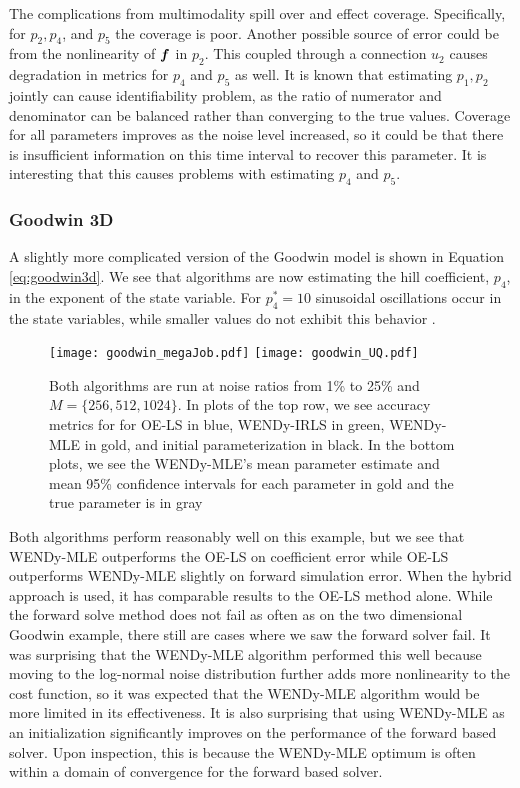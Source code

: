 The complications from multimodality spill over and effect coverage. Specifically, for $p_2, p_4$, and $p_5$ the coverage is poor. Another possible source of error could be from the nonlinearity of $\boldsymbol{f}$ in $p_2$. This coupled through a connection $u_2$ causes degradation in metrics for $p_4$ and $p_5$ as well. It is known that estimating $p_1, p_2$ jointly can cause identifiability problem, as the ratio of numerator and denominator can be balanced rather than converging to the true values. Coverage for all parameters improves as the noise level increased, so it could be that there is insufficient information on this time interval to recover this parameter. It is interesting that this causes problems with estimating $p_4$ and $p_5$.

\subsubsection{Goodwin 3D} \label{sec:goodwin3d}
A slightly more complicated version of the Goodwin model is shown in Equation \eqref{eq:goodwin3d}. We see that algorithms are now estimating the hill coefficient, $p_4$, in the exponent of the state variable. For $p^*_4=10$ sinusoidal oscillations occur in the state variables, while smaller values do not exhibit this behavior \citep{GonzeAbou-Jaoude2013PLoSONE}. 

\begin{figure}[H]
	\centering
	\texttt{[image: goodwin\_megaJob.pdf]}
	\texttt{[image: goodwin\_UQ.pdf]}
	\caption{Both algorithms are run at noise ratios from 1\% to 25\% and $M = \{256, 512, 1024\}$. In plots of the top row, we see accuracy metrics for for OE-LS in blue, WENDy-IRLS in green, WENDy-MLE in gold, and initial parameterization in black. In the bottom plots, we see the WENDy-MLE's mean parameter estimate and mean 95\% confidence intervals for each parameter in gold and the true parameter is in gray}
	\label{fig:goodwin3dMega}
\end{figure}

Both algorithms perform reasonably well on this example, but we see that WENDy-MLE outperforms the OE-LS on coefficient error while OE-LS outperforms WENDy-MLE slightly on forward simulation error. When the hybrid approach is used, it has comparable results to the OE-LS method alone.  While the forward solve method does not fail as often as on the two dimensional Goodwin example, there still are cases where we saw the forward solver fail. It was surprising that the WENDy-MLE algorithm performed this well because moving to the log-normal noise distribution further adds more nonlinearity to the cost function, so it was expected that the WENDy-MLE algorithm would be more limited in its effectiveness. It is also surprising that using WENDy-MLE as an initialization significantly improves on the performance of the forward based solver. Upon inspection, this is because the WENDy-MLE optimum is often within a domain of convergence for the forward based solver. 

